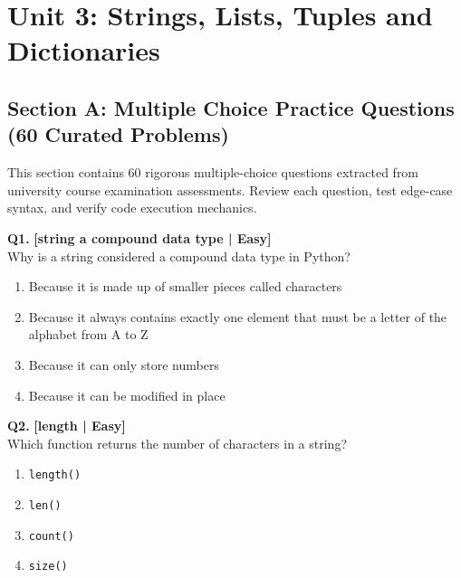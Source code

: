 \chapter{Unit 3: Strings, Lists, Tuples and Dictionaries}

\section{Section A: Multiple Choice Practice Questions (60 Curated Problems)}

\noindent This section contains 60 rigorous multiple-choice questions extracted from university course examination assessments. Review each question, test edge-case syntax, and verify code execution mechanics.
\vspace{3mm}

\noindent\textbf{Q1.} \hfill {\small\color{LPUOrange}\textbf{[string a compound data type | Easy]}}\\[2pt]
Why is a string considered a compound data type in Python?

\begin{enumerate}[label=(\alph*),topsep=2pt,itemsep=1pt,partopsep=0pt,parsep=0pt]
    \item \relax Because it is made up of smaller pieces called characters
    \item \relax Because it always contains exactly one element that must be a letter of the alphabet from A to Z
    \item \relax Because it can only store numbers
    \item \relax Because it can be modified in place
\end{enumerate}
\vspace{2mm}

\noindent\textbf{Q2.} \hfill {\small\color{LPUOrange}\textbf{[length | Easy]}}\\[2pt]
Which function returns the number of characters in a string?

\begin{enumerate}[label=(\alph*),topsep=2pt,itemsep=1pt,partopsep=0pt,parsep=0pt]
    \item \relax \texttt{length()}
    \item \relax \texttt{len()}
    \item \relax \texttt{count()}
    \item \relax \texttt{size()}
\end{enumerate}
\vspace{2mm}

